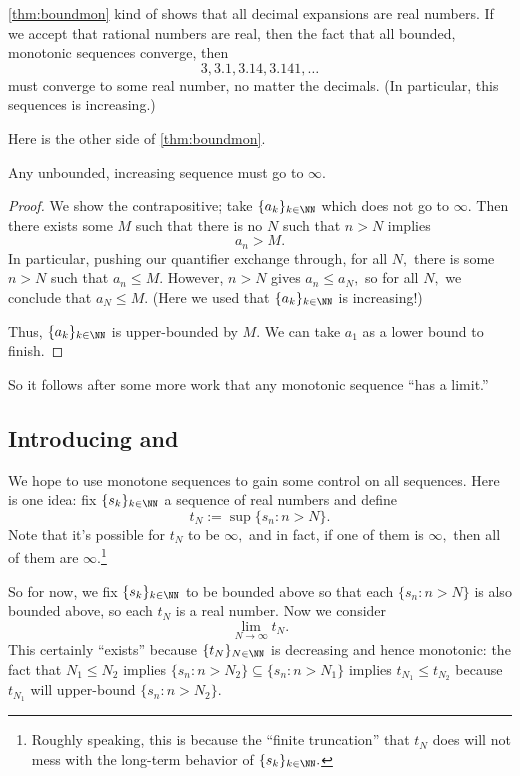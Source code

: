 \documentclass[../notes.tex]{subfiles}
\begin{document}
\begin{remark}
	\autoref{thm:boundmon} kind of shows that all decimal expansions are real numbers. If we accept that rational numbers are real, then the fact that all bounded, monotonic sequences converge, then
	\[3,3.1,3.14,3.141,\ldots\]
	must converge to some real number, no matter the decimals. (In particular, this sequences is increasing.)
\end{remark}
Here is the other side of \autoref{thm:boundmon}.
\begin{proposition}
	Any unbounded, increasing sequence must go to $\infty.$
\end{proposition}
\begin{proof}
	We show the contrapositive; take $\{a_k\}_{k\in\NN}$ which does not go to $\infty.$ Then there exists some $M$ such that there is no $N$ such that $n>N$ implies
	\[a_n>M.\]
	In particular, pushing our quantifier exchange through, for all $N,$ there is some $n>N$ such that $a_n\le M.$ However, $n>N$ gives $a_n\le a_N,$ so for all $N,$ we conclude that $a_N\le M.$ (Here we used that $\{a_k\}_{k\in\NN}$ is increasing!)
	
	Thus, $\{a_k\}_{k\in\NN}$ is upper-bounded by $M.$ We can take $a_1$ as a lower bound to finish.
\end{proof}
So it follows after some more work that any monotonic sequence ``has a limit.''

\subsection{Introducing  and }
We hope to use monotone sequences to gain some control on all sequences. Here is one idea: fix $\{s_k\}_{k\in\NN}$ a sequence of real numbers and define
\[t_N:=\sup\{s_n:n>N\}.\]
Note that it's possible for $t_N$ to be $\infty,$ and in fact, if one of them is $\infty,$ then all of them are $\infty.$\footnote{Roughly speaking, this is because the ``finite truncation'' that $t_N$ does will not mess with the long-term behavior of $\{s_k\}_{k\in\NN}.$}

So for now, we fix $\{s_k\}_{k\in\NN}$ to be bounded above so that each $\{s_n:n>N\}$ is also bounded above, so each $t_N$ is a real number. Now we consider
\[\lim_{N\to\infty}t_N.\]
This certainly ``exists'' because $\{t_N\}_{N\in\NN}$ is decreasing and hence monotonic: the fact that $N_1\le N_2$ implies $\{s_n:n>N_2\}\subseteq\{s_n:n>N_1\}$ implies $t_{N_1}\le t_{N_2}$ because $t_{N_1}$ will upper-bound $\{s_n:n>N_2\}.$
\end{document}
